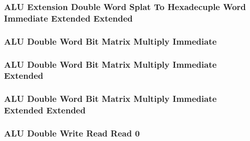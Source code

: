 \subsubsection[{\small ALU Extension Double Word Splat To Hexadecuple Word Immediate Extended Extended}]{ALU Extension Double Word Splat To Hexadecuple Word Immediate Extended Extended} \label{sec:format-ALU-XSDXI.Y}



\subsubsection[{\small ALU Double Word Bit Matrix Multiply Immediate}]{ALU Double Word Bit Matrix Multiply Immediate} \label{sec:format-ALU-DBMWRI}



\subsubsection[{\small ALU Double Word Bit Matrix Multiply Immediate Extended}]{ALU Double Word Bit Matrix Multiply Immediate Extended} \label{sec:format-ALU-DBMWRI.X}



\subsubsection[{\small ALU Double Word Bit Matrix Multiply Immediate Extended Extended}]{ALU Double Word Bit Matrix Multiply Immediate Extended Extended} \label{sec:format-ALU-DBMWRI.Y}



\subsubsection[{\small ALU Double Write Read Read 0}]{ALU Double Write Read Read 0} \label{sec:format-ALU-DWRR0}



